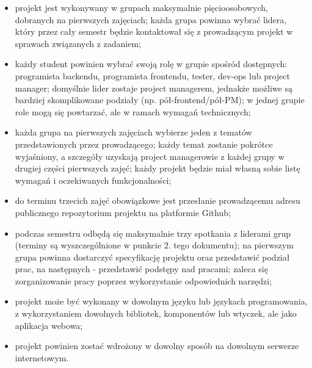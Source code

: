 \documentclass{article}
\begin{document}
	\begin{itemize}
		\item projekt jest wykonywany w grupach maksymalnie pięcioosobowych, dobranych na pierwszych zajęciach; każda grupa powinna wybrać lidera, który przez cały semestr będzie kontaktował się z prowadzącym projekt w sprawach związanych z zadaniem;
		\item każdy student powinien wybrać swoją rolę w grupie spośród dostępnych: programista backendu, programista frontendu, tester, dev-ops lub project manager; domyślnie lider zostaje project managerem, jednakże możliwe są bardziej skomplikowane podziały (np. pół-frontend/pół-PM); w jednej grupie role mogą się powtarzać, ale w ramach wymagań technicznych;
		\item każda grupa na pierwszych zajęciach wybierze jeden z tematów przedstawionych przez prowadzącego; każdy temat zostanie pokrótce wyjaśniony, a szczegóły uzyskają project managerowie z każdej grupy w drugiej części pierwszych zajęć; każdy projekt będzie miał własną sobie listę wymagań i oczekiwanych funkcjonalności;
		\item do terminu trzecich zajęć obowiązkowe jest przesłanie prowadzącemu adresu publicznego repozytorium projektu na platformie Github;
		\item podczas semestru odbędą się maksymalnie trzy spotkania z liderami grup (terminy są wyszczególnione w punkcie 2. tego dokumentu); na pierwszym grupa powinna dostarczyć specyfikację projektu oraz przedstawić podział prac, na następnych - przedstawić podstępy nad pracami; zaleca się zorganizowanie pracy poprzez wykorzystanie odpowiednich narzędzi;
		\item projekt może być wykonany w dowolnym języku lub językach programowania, z wykorzystaniem dowolnych bibliotek, komponentów lub wtyczek, ale jako aplikacja webowa;
		\item projekt powinien zostać wdrożony w dowolny sposób na dowolnym serwerze internetowym.
	\end{itemize}
\end{document}
